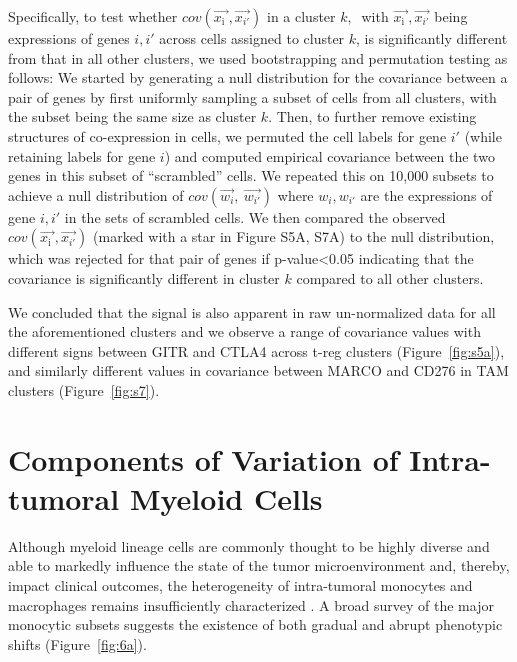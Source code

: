 Specifically, to test whether \(cov(\overrightarrow{x_{\text{i\ }}},\overrightarrow{x_{i'}})\) in a cluster \(k,\ \) with \(\overrightarrow{x_{\text{i\ }}},\overrightarrow{x_{i'}}\) being expressions of genes \(i,i'\) across cells assigned to cluster \(k\), is significantly different from that in all other clusters, we used bootstrapping and permutation testing as follows: We started by generating a null distribution for the covariance between a pair of genes by first uniformly sampling a subset of cells from all clusters, with the subset being the same size as cluster \(k\).
Then, to further remove existing structures of co-expression in cells, we permuted the cell labels for gene \(i'\) (while retaining labels for gene \(i\)) and computed empirical covariance between the two genes in this subset of ``scrambled'' cells.
We repeated this on 10,000 subsets to achieve a null distribution of \(cov(\overrightarrow{w_{i}},\ \overrightarrow{w_{i'}})\) where \(w_{i},w_{i'}\) are the expressions of gene \(i,i'\) in the sets of scrambled cells.
We then compared the observed \(cov(\overrightarrow{x_{\text{i\ }}},\overrightarrow{x_{i'}})\) (marked with a star in Figure S5A, S7A) to the null distribution, which was rejected for that pair of genes if p-value\textless{}0.05 indicating that the covariance is significantly different in cluster \(k\) compared to all other clusters.

We concluded that the signal is also apparent in raw un-normalized data for all the aforementioned clusters and we observe a range of covariance values with different signs between GITR and CTLA4 across t-reg clusters (Figure~\ref{fig:s5a}), and similarly different values in covariance between MARCO and CD276 in TAM clusters (Figure~\ref{fig:s7}).

\section{Components of Variation of Intra-tumoral Myeloid Cells}

Although myeloid lineage cells are commonly thought to be highly diverse and able to markedly influence the state of the tumor microenvironment and, thereby, impact clinical outcomes, the heterogeneity of intra-tumoral monocytes and macrophages remains insufficiently characterized \citep{Campbell2011,DeHenau2016,Engblom2016,Eppert2011,Gholamin2017,Pyonteck2013}.
A broad survey of the major monocytic subsets suggests the existence of both gradual and abrupt phenotypic shifts (Figure~\ref{fig:6a}).

